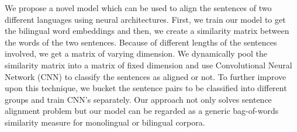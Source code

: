 We propose a novel model which can be used to align the sentences of two different languages using neural architectures. First, we train our model to get the bilingual word embeddings and then, we create a similarity matrix between the words of the two sentences. Because of different lengths of the sentences involved, we get a matrix of varying dimension. We dynamically pool the similarity matrix into a matrix of fixed dimension and use Convolutional Neural Network (CNN) to classify the sentences as aligned or not. To further improve upon this technique, we bucket the sentence pairs to be classified into different groups and train CNN's separately. Our approach not only solves sentence alignment problem but our model can be regarded as a generic bag-of-words similarity measure for monolingual or bilingual corpora.
